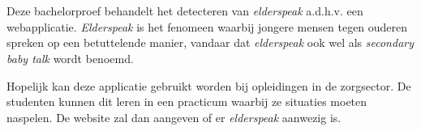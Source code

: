 
%
%

%



\chapter*{}

\color{black}
Deze bachelorproef behandelt het detecteren van \textit{elderspeak} a.d.h.v. een webapplicatie. \textit{Elderspeak} is het fenomeen waarbij jongere mensen tegen ouderen spreken op een betuttelende manier,  vandaar dat \textit{elderspeak} ook wel als \textit{secondary baby talk} wordt benoemd.

Hopelijk kan deze applicatie gebruikt worden bij opleidingen in de zorgsector. De studenten kunnen dit leren in een practicum waarbij ze situaties moeten naspelen. De website zal dan aangeven of er \textit{elderspeak} aanwezig is.

